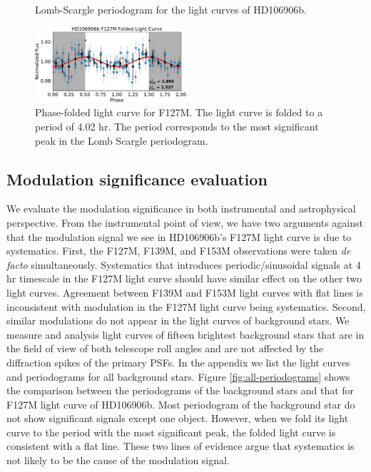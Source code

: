\documentclass[modern]{aastex62}
\begin{document}
\begin{figure}
  \centering
  \caption{Lomb-Scargle periodogram for the light curves of HD106906b.}
  \label{fig:periodogram}
\end{figure}

\begin{figure}
  \centering
  \includegraphics[width=0.5\textwidth]{figures/F127M_foldedLC.pdf}
  \caption{Phase-folded light curve for F127M. The light curve is folded to a period of 4.02 hr. The period corresponds to the most significant peak in the Lomb Scargle periodogram.}
  \label{fig:fold}
\end{figure}

\subsection{Modulation significance evaluation}

We evaluate the modulation significance in both instrumental and astrophysical perspective. From the instrumental point of view, we have two arguments against that the modulation signal we see in HD106906b's F127M light curve is due to systematics. First, the F127M, F139M, and F153M observations were taken \emph{de facto} simultaneously. Systematics that introduces periodic/sinusoidal signals at 4 hr timescale in the F127M light curve should have similar effect on the other two light curves. Agreement between F139M and F153M light curves with flat lines is inconsistent with modulation in the F127M light curve being systematics. Second, similar modulations do not appear in the light curves of background stars. We measure and analysis light curves of fifteen brightest background stars that are in the field of view of both telescope roll angles and are not affected by the diffraction spikes of the primary PSFs. In the appendix we list the light curves and periodograms for all background stars. Figure \ref{fig:all-periodograms} shows the comparison between the periodograms of the background stars and that for F127M light curve of HD106906b. Most periodogram of the background star do not show significant signals except one object. However, when we fold its light curve to the period with the most significant peak, the folded light curve is consistent with a flat line. These two lines of evidence argue that systematics is not likely to be the cause of the modulation signal.
\end{document}
